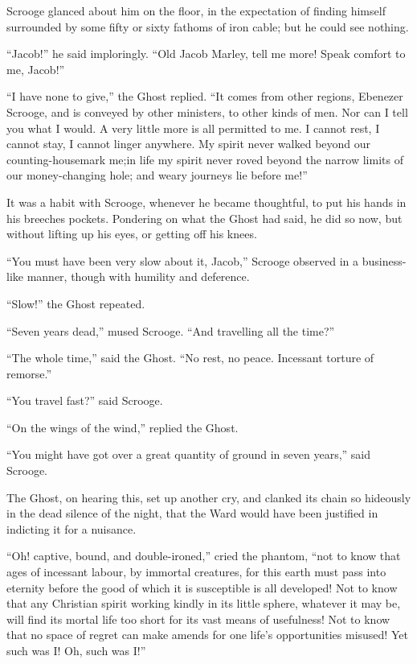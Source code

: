 \documentclass[paper=5.5in:8.5in,BCOR=7mm,twoside,DIV=calc,12pt,usegeometry]{scrbook} %
\begin{document}
Scrooge glanced about him on the floor, in the expectation of finding himself surrounded by some fifty or sixty fathoms of iron cable; but he could see nothing.




\enquote{Jacob!} he said imploringly. \enquote{Old Jacob Marley, tell me more! Speak comfort to me, Jacob!}



\enquote{I have none to give,} the Ghost replied. \enquote{It comes from other regions, Ebenezer Scrooge, and is conveyed by other ministers, to other kinds of men. Nor can I tell you what I would. A very little more is all permitted to me. I cannot rest, I cannot stay, I cannot linger anywhere. My spirit never walked beyond our counting-house\textemdash mark me;\textemdash in life my spirit never roved beyond the narrow limits of our money-changing hole; and weary journeys lie before me!}



It was a habit with Scrooge, whenever he became thoughtful, to put his hands in his breeches pockets. Pondering on what the Ghost had said, he did so now, but without lifting up his eyes, or getting off his knees.

\enquote{You must have been very slow about it, Jacob,} Scrooge observed in a business-like manner, though with humility and deference.



\enquote{Slow!} the Ghost repeated.

\enquote{Seven years dead,} mused Scrooge. \enquote{And travelling all the time?}



\enquote{The whole time,} said the Ghost. \enquote{No rest, no peace. Incessant torture of remorse.}

\enquote{You travel fast?} said Scrooge.

\enquote{On the wings of the wind,} replied the Ghost. 

\enquote{You might have got over a great quantity of ground in seven years,} said Scrooge.

The Ghost, on hearing this, set up another cry, and clanked its chain so hideously in the dead silence of the night, that the Ward would have been justified in indicting it for a nuisance.

\enquote{Oh! captive, bound, and double-ironed,} cried the phantom, \enquote{not to know that ages of incessant labour, by immortal creatures, for this earth must pass into eternity before the good of which it is susceptible is all developed! Not to know that any Christian spirit working kindly in its little sphere, whatever it may be, will find its mortal life too short for its vast means of usefulness! Not to know that no space of regret can make amends for one life's opportunities misused! Yet such was I! Oh, such was I!}
\end{document}

